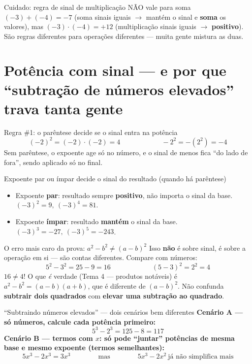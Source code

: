 \documentclass[12pt,a4paper]{article}
\begin{document}
\begin{atencao}{Cuidado: regra de sinal de multiplicação NÃO vale para soma}
$(-3)+(-4) = -7$ (soma sinais iguais $\to$ mantém o sinal e \textbf{soma} os
valores), mas $(-3)\cdot(-4)=+12$ (multiplicação sinais iguais $\to$
\textbf{positivo}). São regras diferentes para operações diferentes —
muita gente mistura as duas.
\end{atencao}

\section{Potência com sinal — e por que ``subtração de números elevados'' trava tanta gente}

\begin{atencao}{Regra \#1: o parêntese decide se o sinal entra na potência}
\[
(-2)^2 = (-2)\cdot(-2) = 4 \qquad\qquad\qquad -2^2 = -(2^2) = -4
\]
Sem parêntese, o expoente age só no número, e o sinal de menos fica
``do lado de fora'', sendo aplicado só no final.
\end{atencao}

\begin{definicao}{Expoente par ou ímpar decide o sinal do resultado (quando há parêntese)}
\begin{itemize}[nosep]
  \item Expoente \textbf{par}: resultado sempre \textbf{positivo}, não importa o sinal da base.
  $(-3)^2=9,\ (-3)^4=81$.
  \item Expoente \textbf{ímpar}: resultado \textbf{mantém} o sinal da base.
  $(-3)^3=-27,\ (-3)^5=-243$.
\end{itemize}
\end{definicao}

\begin{atencao}{O erro mais caro da prova: $a^2-b^2 \neq (a-b)^2$}
Isso \textbf{não} é sobre sinal, é sobre a operação em si — são contas
diferentes. Compare com números:
\[
5^2-3^2 = 25-9=16 \qquad\qquad\qquad (5-3)^2 = 2^2=4
\]
$16 \neq 4$! O que \emph{é} verdade (Tema 4 — produtos notáveis) é
$a^2-b^2=(a-b)(a+b)$, que é diferente de $(a-b)^2$. Não confunda
\textbf{subtrair dois quadrados} com \textbf{elevar uma subtração ao
quadrado}.
\end{atencao}

\begin{exemplo}{``Subtraindo números elevados'' — dois cenários bem diferentes}
\textbf{Cenário A — só números, calcule cada potência primeiro:}
\[
5^3 - 2^3 = 125-8=117
\]
\textbf{Cenário B — termos com $x$: só pode ``juntar'' potências de mesma
base e mesmo expoente (termos semelhantes):}
\[
5x^3-2x^3 = 3x^3 \qquad\qquad\text{mas}\qquad\qquad 5x^3-2x^2 \ \text{já não simplifica mais}
\]
\end{exemplo}
\end{document}
